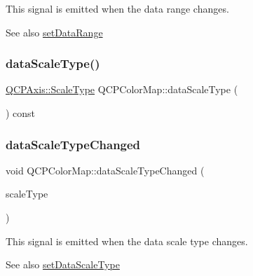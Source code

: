 This signal is emitted when the data range changes.

\begin{DoxySeeAlso}{See also}
\mbox{\hyperlink{class_q_c_p_color_map_a980b42837821159786a85b4b7dcb8774}{set\+Data\+Range}} 
\end{DoxySeeAlso}
\mbox{\label{class_q_c_p_color_map_ab796f2dccc90fb7a354b6732c33ec9be}} 
\subsubsection{\texorpdfstring{dataScaleType()}{dataScaleType()}}
{\footnotesize\ttfamily \mbox{\hyperlink{class_q_c_p_axis_a36d8e8658dbaa179bf2aeb973db2d6f0}{Q\+C\+P\+Axis\+::\+Scale\+Type}} Q\+C\+P\+Color\+Map\+::data\+Scale\+Type (\begin{DoxyParamCaption}{ }\end{DoxyParamCaption}) const\hspace{0.3cm}{\ttfamily [inline]}}

\mbox{\label{class_q_c_p_color_map_a978d5d5c9f68cffef8c902b855c04490}} 
\subsubsection{\texorpdfstring{dataScaleTypeChanged}{dataScaleTypeChanged}}
{\footnotesize\ttfamily void Q\+C\+P\+Color\+Map\+::data\+Scale\+Type\+Changed (\begin{DoxyParamCaption}\item[{\mbox{\hyperlink{class_q_c_p_axis_a36d8e8658dbaa179bf2aeb973db2d6f0}{Q\+C\+P\+Axis\+::\+Scale\+Type}}}]{scale\+Type }\end{DoxyParamCaption})\hspace{0.3cm}{\ttfamily [signal]}}

This signal is emitted when the data scale type changes.

\begin{DoxySeeAlso}{See also}
\mbox{\hyperlink{class_q_c_p_color_map_a9d20aa08e3c1f20f22908c45b9c06511}{set\+Data\+Scale\+Type}} 
\end{DoxySeeAlso}
\mbox{\label{class_q_c_p_color_map_a6b628014d2939368935efd0a788648c8}} 
